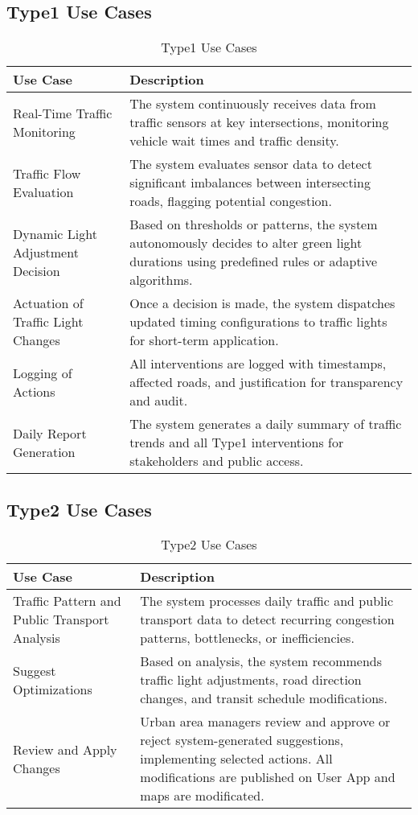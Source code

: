\documentclass[a4paper,12pt]{article}
\begin{document}
\subsection*{Type1 Use Cases}
\begin{table}[h!]
\centering
\begin{tabular}{|p{4.5cm}|p{8.5cm}|}
\hline
\textbf{Use Case} & \textbf{Description} \\
\hline
Real-Time Traffic Monitoring & The system continuously receives data from traffic sensors at key intersections, monitoring vehicle wait times and traffic density. \\
\hline
Traffic Flow Evaluation & The system evaluates sensor data to detect significant imbalances between intersecting roads, flagging potential congestion. \\
\hline
Dynamic Light Adjustment Decision & Based on thresholds or patterns, the system autonomously decides to alter green light durations using predefined rules or adaptive algorithms. \\
\hline
Actuation of Traffic Light Changes & Once a decision is made, the system dispatches updated timing configurations to traffic lights for short-term application. \\
\hline
Logging of Actions & All interventions are logged with timestamps, affected roads, and justification for transparency and audit. \\
\hline
Daily Report Generation & The system generates a daily summary of traffic trends and all Type1 interventions for stakeholders and public access. \\
\hline
\end{tabular}
\caption{Type1 Use Cases}
\end{table}

\newpage

\subsection*{Type2 Use Cases}

\begin{table}[h!]
\centering
\begin{tabular}{|p{4.5cm}|p{8.5cm}|}
\hline
\textbf{Use Case} & \textbf{Description} \\
\hline
Traffic Pattern and Public Transport Analysis & The system processes daily traffic and public transport data to detect recurring congestion patterns, bottlenecks, or inefficiencies. \\
\hline
Suggest Optimizations & Based on analysis, the system recommends traffic light adjustments, road direction changes, and transit schedule modifications. \\
\hline
Review and Apply Changes & Urban area managers review and approve or reject system-generated suggestions, implementing selected actions. All modifications are published on User App and maps are modificated. \\
\hline
\end{tabular}
\caption{Type2 Use Cases}
\end{table}
\end{document}
